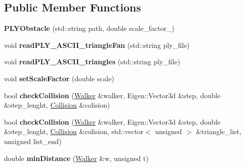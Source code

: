 \subsection*{Public Member Functions}
\begin{DoxyCompactItemize}
\item 
\mbox{\label{class_p_l_y_obstacle_a8995508a44982787e9aa44bc8d47f669}} 
{\bfseries P\+L\+Y\+Obstacle} (std\+::string path, double scale\+\_\+factor\+\_)
\item 
\mbox{\label{class_p_l_y_obstacle_a4e409be3ded2cb3fe2f3cae97fafd266}} 
void {\bfseries read\+P\+L\+Y\+\_\+\+A\+S\+C\+I\+I\+\_\+triangle\+Fan} (std\+::string ply\+\_\+file)
\item 
\mbox{\label{class_p_l_y_obstacle_af5db9263d9555682f8345cef2d116eb4}} 
void {\bfseries read\+P\+L\+Y\+\_\+\+A\+S\+C\+I\+I\+\_\+triangles} (std\+::string ply\+\_\+file)
\item 
\mbox{\label{class_p_l_y_obstacle_ad0ce0257b8250a5e325da3f0d58e90de}} 
void {\bfseries set\+Scale\+Factor} (double scale)
\item 
\mbox{\label{class_p_l_y_obstacle_aa43eb5a352acb2305b0ad5d4f3535dd1}} 
bool {\bfseries check\+Collision} (\hyperlink{class_walker}{Walker} \&walker, Eigen\+::\+Vector3d \&step, double \&step\+\_\+lenght, \hyperlink{class_collision}{Collision} \&colision)
\item 
\mbox{\label{class_p_l_y_obstacle_ada5a479826a277b78f7531693809e69c}} 
bool {\bfseries check\+Collision} (\hyperlink{class_walker}{Walker} \&walker, Eigen\+::\+Vector3d \&step, double \&step\+\_\+lenght, \hyperlink{class_collision}{Collision} \&colision, std\+::vector$<$ unsigned $>$ \&triangle\+\_\+list, unsigned list\+\_\+end)
\item 
\mbox{\label{class_p_l_y_obstacle_aef64d5d9c5ea9d16c0efb75b89dc7ba0}} 
double {\bfseries min\+Distance} (\hyperlink{class_walker}{Walker} \&w, unsigned t)
\end{DoxyCompactItemize}
